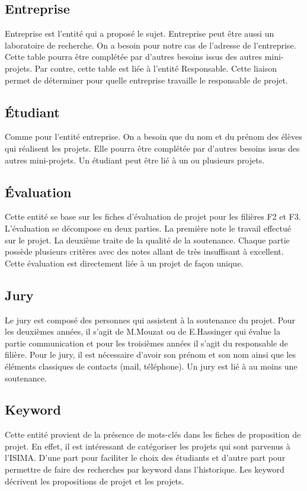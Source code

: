 \documentclass[a4paper,11pt]{report}
\begin{document}
\subsection{Entreprise}

\normalsize{
Entreprise est l'entité qui a proposé le sujet. Entreprise peut être aussi un laboratoire de recherche. On a besoin pour notre cas de l'adresse de l'entreprise. Cette table pourra être complétée par d'autres besoins issus des autres mini-projets. Par contre, cette table est liée à l'entité Responsable. Cette liaison permet de déterminer pour quelle entreprise travaille le responsable de projet.
}

\subsection{Étudiant}
\normalsize{
Comme pour l'entité entreprise. On a besoin que du nom et du prénom des élèves qui réalisent les projets. Elle pourra être complétée par d'autres besoins issus des autres mini-projets. Un étudiant peut être lié à un ou plusieurs projets.
}

\subsection{Évaluation}
\normalsize{
Cette entité se base sur les fiches d'évaluation de projet pour les filières F2 et F3. L'évaluation se décompose en deux parties. La première note le travail effectué sur le projet. La deuxième traite de la qualité de la soutenance. Chaque partie possède plusieurs critères avec des notes allant de très insuffisant à excellent. Cette évaluation est directement liée à un projet de façon unique.
}


\subsection{Jury}
\normalsize{
Le jury est composé des personnes qui assistent à la soutenance du projet. Pour les deuxièmes années, il s'agit de M.Mouzat ou de E.Hassinger qui évalue la partie communication et pour les troisièmes années il s'agit du responsable de filière. Pour le jury, il est nécessaire d'avoir son prénom et son nom ainsi que les éléments classiques de contacts (mail, téléphone). Un jury est lié à au moins une soutenance.
}

\subsection{Keyword}
\normalsize{
Cette entité provient de la présence de mots-clés dans les fiches de proposition de projet. En effet, il est intéressant de catégoriser les projets qui sont parvenus à l'ISIMA. D'une part pour faciliter le choix des étudiants et d'autre part pour permettre de faire des recherches par keyword dans l'historique. Les keyword décrivent les propositions de projet et les projets.
}
\end{document}
